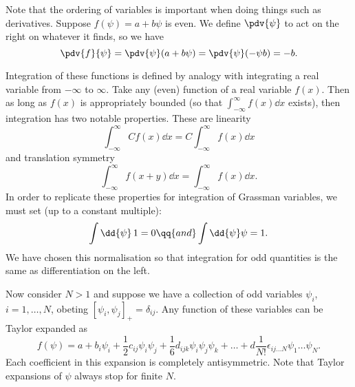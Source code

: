 \documentclass{jknotes} %
\begin{document}
Note that the ordering of variables is important when doing things such as derivatives. Suppose \(f(\psi) = a+b\psi\) is even. We define \(\pdv{\psi}\) to act on the right on whatever it finds, so we have
\begin{equation}
    \pdv{f}{\psi} = \pdv{\psi}(a+b\psi) = \pdv{\psi}(-\psi b) = -b.
\end{equation}

Integration of these functions is defined by analogy with integrating a real variable from \(-\infty\) to \(\infty\). Take any (even) function of a real variable \(f(x)\). Then as long as \(f(x)\) is appropriately bounded (so that \(\int_{-\infty}^\infty f(x)\dd{x}\) exists), then integration has two notable properties. These are linearity
\begin{equation}
    \int^\infty_{-\infty} Cf(x)\dd{x} = C\int^\infty_{-\infty} f(x)\dd{x}
\end{equation}
and translation symmetry
\begin{equation}
    \int^\infty_{-\infty} f(x+y)\dd{x} = \int^\infty_{-\infty} f(x)\dd{x}.
\end{equation}
In order to replicate these properties for integration of Grassman variables, we must set (up to a constant multiple):
\begin{equation}
    \int\dd{\psi}\,1 = 0 \qq{and} \int\dd{\psi}\psi=1.
\end{equation}
We have chosen this normalisation so that integration for odd quantities is the same as differentiation on the left.

Now consider \(N>1\) and suppose we have a collection of odd variables \(\psi_i\), \(i=1,\dots,N\), obeting \([\psi_i,\psi_j]_+=\delta_{ij}\). Any function of these variables can be Taylor expanded as
\begin{equation}
    f(\psi)=a+b_i\psi_i + \frac{1}{2}c_{ij}\psi_i\psi_j + \frac{1}{6}d_{ijk}\psi_i\psi_j\psi_k + \dots + d\frac{1}{N!}\epsilon_{ij\dots N}\psi_1\dots\psi_N.
\end{equation}
Each coefficient in this expansion is completely antisymmetric. Note that Taylor expansions of \(\psi\) always stop for finite \(N\).
\end{document}

